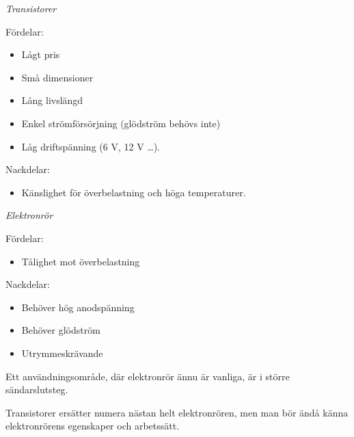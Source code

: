 \emph{Transistorer}

Fördelar:
\begin{itemize}
\item Lågt pris
\item Små dimensioner
\item Lång livslängd
\item Enkel strömförsörjning (glödström behövs inte)
\item Låg driftspänning (6 V, 12 V \ldots ).
\end{itemize}

Nackdelar:
\begin{itemize}
\item Känslighet för överbelastning och höga temperaturer.
\end{itemize}

\emph{Elektronrör}

Fördelar:
\begin{itemize}
\item Tålighet mot överbelastning
\end{itemize}

Nackdelar:
\begin{itemize}
\item Behöver hög anodspänning
\item Behöver glödström
\item Utrymmeskrävande
\end{itemize}

Ett användningsområde, där elektronrör ännu är vanliga, är i större
sändarslutsteg.

Transistorer ersätter numera nästan helt elektronrören, men man bör ändå känna
elektronrörens egenskaper och arbetssätt.
